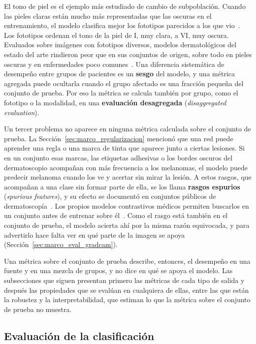 El tono de piel es el ejemplo más estudiado de cambio de subpoblación. Cuando las pieles claras están mucho más
representadas que las oscuras en el entrenamiento, el modelo clasifica mejor los fototipos parecidos a los que vio~\cite{groh2021neural}. Los fototipos ordenan el tono de la piel de I, muy clara, a VI, muy oscura. Evaluados sobre imágenes con fototipos diversos, modelos dermatológicos del estado del
arte rindieron peor que en sus conjuntos de origen, sobre todo en pieles oscuras y en enfermedades poco
comunes~\cite{daneshjou2022disparities}. Una diferencia sistemática de desempeño entre grupos de pacientes es un
\textbf{sesgo} del modelo, y una métrica agregada puede ocultarla cuando el grupo afectado es una fracción pequeña
del conjunto de prueba. Por eso la métrica se calcula también por grupo, como el fototipo o la modalidad, en una
\textbf{evaluación desagregada} (\emph{disaggregated evaluation}).

Un tercer problema no aparece en ninguna métrica calculada sobre el conjunto de prueba. La
Sección~\ref{sec:marco_regularizacion} mencionó que una red puede aprender una regla o una marca de tinta que
aparece junto a ciertas lesiones. Si en un conjunto esas marcas, las etiquetas adhesivas o los bordes oscuros del
dermatoscopio acompañan con más frecuencia a los melanomas, el modelo puede predecir melanoma cuando los ve y
acertar sin mirar la lesión. A estos rasgos, que acompañan a una clase sin formar parte de ella, se los llama
\textbf{rasgos espurios} (\emph{spurious features}), y su efecto se documentó en conjuntos públicos de dermatoscopía~\cite{yan2023towards}.
Los propios modelos contrastivos médicos permiten buscarlos en un conjunto antes de entrenar sobre
él~\cite{kim2024transparent}. Como el rasgo está también en el conjunto de prueba, el modelo acierta ahí por la misma razón
equivocada, y para advertirlo hace falta ver en qué parte de la imagen se apoya
(Sección~\ref{sec:marco_eval_gradcam}).

Una métrica sobre el conjunto de prueba describe, entonces, el desempeño en una fuente y en una mezcla de grupos, y no dice en
qué se apoya el modelo. Las subsecciones que siguen presentan primero las métricas de cada tipo de salida y después
las propiedades que se evalúan en cualquiera de ellas, entre las que están la robustez y la interpretabilidad, que
estiman lo que la métrica sobre el conjunto de prueba no muestra.

\subsection{Evaluación de la clasificación}
\label{sec:marco_eval_clasif}

